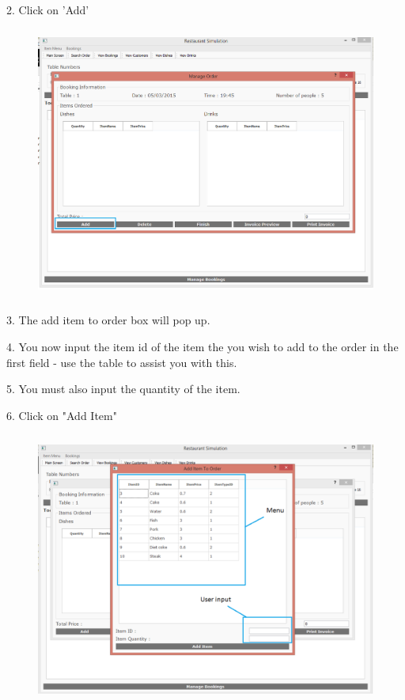 2. Click on 'Add'

\begin{figure}[H]
    \includegraphics[height = 9cm]{./Manual/images/AddItemOrder1} 
    \caption{} \label{fig:additemorder2}
\end{figure}

3. The add item to order box will pop up.

4. You now input the item id of the item the you wish to add to the order in the first field - use the table to assist you with this.

5. You must also input the quantity of the item.

6. Click on "Add Item"

\begin{figure}[H]
    \includegraphics[height = 9cm]{./Manual/images/AddItemOrder2} 
    \caption{} \label{fig:additemorder3}
\end{figure}

